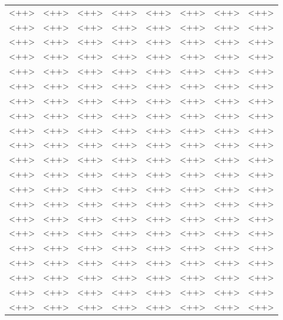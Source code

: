 \documentclass[11pt]{article}
\begin{document}
\begin{table}[h]
\begin{center}
\begin{tabular}{lllcllll}
<++> & <++> & <++> & <++> & <++> & <++> & <++> & <++>\\
<++> & <++> & <++> & <++> & <++> & <++> & <++> & <++>\\
<++> & <++> & <++> & <++> & <++> & <++> & <++> & <++>\\
<++> & <++> & <++> & <++> & <++> & <++> & <++> & <++>\\
<++> & <++> & <++> & <++> & <++> & <++> & <++> & <++>\\
<++> & <++> & <++> & <++> & <++> & <++> & <++> & <++>\\
<++> & <++> & <++> & <++> & <++> & <++> & <++> & <++>\\
<++> & <++> & <++> & <++> & <++> & <++> & <++> & <++>\\
<++> & <++> & <++> & <++> & <++> & <++> & <++> & <++>\\
<++> & <++> & <++> & <++> & <++> & <++> & <++> & <++>\\
<++> & <++> & <++> & <++> & <++> & <++> & <++> & <++>\\
<++> & <++> & <++> & <++> & <++> & <++> & <++> & <++>\\
<++> & <++> & <++> & <++> & <++> & <++> & <++> & <++>\\
<++> & <++> & <++> & <++> & <++> & <++> & <++> & <++>\\
<++> & <++> & <++> & <++> & <++> & <++> & <++> & <++>\\
<++> & <++> & <++> & <++> & <++> & <++> & <++> & <++>\\
<++> & <++> & <++> & <++> & <++> & <++> & <++> & <++>\\
<++> & <++> & <++> & <++> & <++> & <++> & <++> & <++>\\
<++> & <++> & <++> & <++> & <++> & <++> & <++> & <++>\\
<++> & <++> & <++> & <++> & <++> & <++> & <++> & <++>\\
<++> & <++> & <++> & <++> & <++> & <++> & <++> & <++>\\
\end{tabular}
\end{center}
\end{table}
\FloatBarrier



\end{document}

